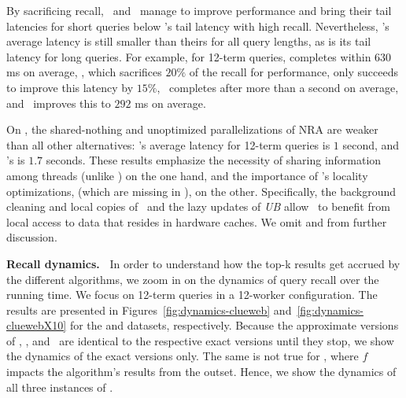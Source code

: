 {{%
By sacrificing recall, \pBMW\ and \pJASS\ manage to improve performance and bring their tail latencies for short queries below \alg's tail latency with high recall. Nevertheless, \alg's average latency is still smaller than theirs for all query lengths, as is its tail latency for long queries.
For example, for 12-term queries, 
\pBMW\hi\/ completes  within $630$ ms on average, 
\pBMW\lo, 
which sacrifices $20\%$ of the recall for performance, only succeeds to improve this latency by $15\%$, 
\pJASS\hi\ completes  after more than a second on average, and \pJASS\lo\ improves this to $292$ ms on average.

On \cw, 
the shared-nothing and unoptimized parallelizations of NRA are weaker than all other alternatives:
\pNRA's  average latency for 12-term queries is $1$ second, and \sNRA's is $1.7$ seconds. 
These results emphasize the necessity of sharing information among threads (unlike \sNRA) on the one hand,
and the importance of \alg's locality optimizations, (which are missing in \pNRA), on the other. 
Specifically, the background cleaning and local copies of \DMap\ and the lazy updates of \emph{UB} allow \alg\ to benefit from 
local access to data that resides in hardware caches. 
We omit \pNRA\/ and \sNRA\/ from further discussion. 



{\bf Recall dynamics.\ } 
In order to understand how the top-k results get accrued by the different algorithms, we zoom in on the dynamics of query 
recall over the running time. We focus on 12-term queries in a 12-worker configuration. The results are presented in 
Figures~\ref{fig:dynamics-clueweb} and~\ref{fig:dynamics-cluewebX10} for the \cw\/ and \cwten\/ datasets, respectively.
Because the approximate versions of \alg, \pRA, and \pJASS\ are  identical to the respective exact versions until they stop, 
we show the dynamics of the exact versions only.  The same is not true for \pBMW, where $f$ impacts the algorithm's results from the outset.
Hence, we show the dynamics of all three instances of \pBMW. 

}}
